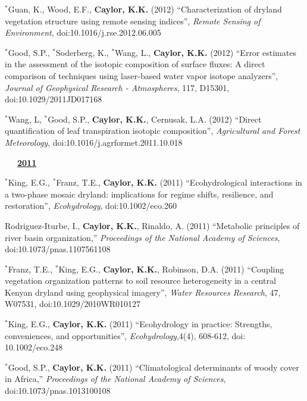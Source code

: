 \documentclass[10pt]{report}
\begin{document}
\begin{etaremune}
\item $^{*}$Guan, K., Wood, E.F., \textbf{Caylor, K.K.} (2012) ``Characterization of dryland vegetation structure using remote sensing indices'', {\em Remote Sensing of Environment}, doi:10.1016/j.rse.2012.06.005

\item $^{*}$Good, S.P., $^{*}$Soderberg, K., $^{*}$Wang, L., \textbf{Caylor, K.K.} (2012) ``Error estimates in the assessment of the isotopic composition of surface fluxes: A direct comparison of techniques using laser-based water vapor isotope analyzers'', {\em Journal of Geophysical Research - Atmospheres}, 117, D15301, doi:10.1029/2011JD017168

\item $^{*}$Wang, L,  $^{*}$Good, S.P., \textbf{Caylor, K.K.}, Cernusak, L.A. (2012) ``Direct quantification of leaf transpiration isotopic composition'', {\em Agricultural and Forest Meteorology}, doi:10.1016/j.agrformet.2011.10.018

\mbox{\ \ \ \underline{\textbf{2011}}}

\item $^{*}$King, E.G.,  $^{*}$Franz, T.E., \textbf{Caylor, K.K.} (2011) ``Ecohydrological interactions in a two-phase mosaic dryland: implications for regime shifts, resilience, and restoration'', {\em Ecohydrology}, doi:10.1002/eco.260

\item Rodriguez-Iturbe, I.,  \textbf{Caylor, K.K.}, Rinaldo, A. (2011) ``Metabolic principles of river basin organization,'' {\em Proceedings of the National Academy of Sciences}, doi:10.1073/pnas.1107561108

\item  $^{*}$Franz, T.E., $^{*}$King, E.G., \textbf{Caylor, K.K.}, Robinson, D.A. (2011) ``Coupling vegetation organization patterns to soil resource heterogeneity in a central Kenyan dryland using geophysical imagery'', {\em Water Resources Research}, 47, W07531, doi:10.1029/2010WR010127

\item $^{*}$King, E.G., \textbf{Caylor, K.K.} (2011) ``Ecohydrology in practice: Strengths, conveniences, and opportunities'', {\em Ecohydrology},4(4), 608-612, doi: 10.1002/eco.248

\item $^{*}$Good, S.P., \textbf{Caylor, K.K.} (2011) ``Climatological determinants of woody cover in Africa,'' {\em Proceedings of the National Academy of Sciences}, doi:10.1073/pnas.1013100108


\end{etaremune}
\end{document}

